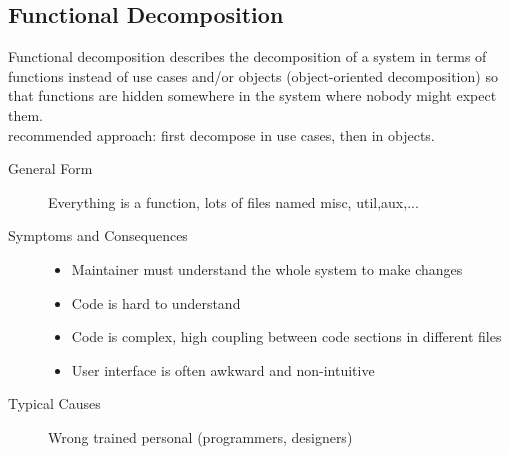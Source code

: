\subsection{Functional Decomposition}
Functional decomposition describes the decomposition of a system in terms of functions instead of use cases and/or objects (object-oriented decomposition) so that functions are hidden somewhere in the system where nobody might expect them.\\
recommended approach: first decompose in use cases, then in objects.
\begin{description}
  \item[General Form] Everything is a function, lots of files named misc, util,aux,...
  \item[Symptoms and Consequences] \hfill
  \begin{itemize}
    \item Maintainer must understand the whole system to make changes
     \item Code is hard to understand
     \item Code is complex, high coupling between code sections in different files
     \item User interface is often awkward and non-intuitive
  \end{itemize}
  \item[Typical Causes] Wrong trained personal (programmers, designers)

\end{description}
\newpage
